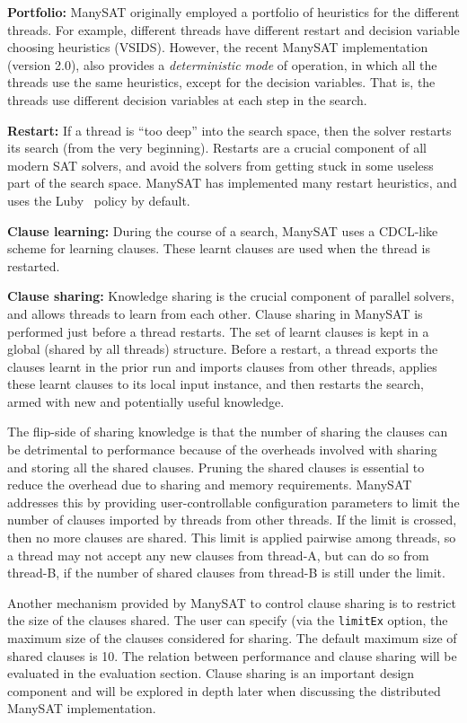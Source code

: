 \documentclass{article}
\begin{document}
\textbf{Portfolio: } ManySAT originally employed a portfolio of
heuristics for the different threads. For example, different threads
have different restart and decision variable choosing heuristics
(VSIDS). However, the recent ManySAT implementation (version 2.0),
also provides a \emph{deterministic mode} of operation, in which all
the threads use the same heuristics, except for the decision
variables. That is, the threads use different decision variables at
each step in the search.


\textbf{Restart: } If a thread is ``too deep'' into the search space,
then the solver restarts its search (from the very
beginning). Restarts are a crucial component of all modern SAT
solvers, and avoid the solvers from getting stuck in some useless part
of the search space. ManySAT has implemented many restart heuristics,
and uses the Luby~\cite{luby} policy by default.

\textbf{Clause learning: } During the course of a search, ManySAT uses
a CDCL-like scheme for learning clauses. These learnt clauses are used
when the thread is restarted.

\textbf{Clause sharing: } Knowledge sharing is the crucial component
of parallel solvers, and allows threads to learn from each
other. Clause sharing in ManySAT is performed just before a thread
restarts. The set of learnt clauses is kept in a global (shared by all
threads) structure. Before a restart, a thread exports the clauses
learnt in the prior run and imports clauses from other threads,
applies these learnt clauses to its local input instance, and then
restarts the search, armed with new and potentially useful
knowledge. 

The flip-side of sharing knowledge is that the number of sharing the
clauses can be detrimental to performance because of the overheads
involved with sharing and storing all the shared clauses. Pruning the
shared clauses is essential to reduce the overhead due to sharing and
memory requirements. ManySAT addresses this by providing
user-controllable configuration parameters to limit the number of
clauses imported by threads from other threads. If the limit is
crossed, then no more clauses are shared. This limit is applied
pairwise among threads, so a thread may not accept any new clauses
from thread-A, but can do so from thread-B, if the number of shared
clauses from thread-B is still under the limit.


Another mechanism provided by ManySAT to control clause sharing is to
restrict the size of the clauses shared. The user can specify (via the
\texttt{limitEx} option, the maximum size of the clauses considered
for sharing. The default maximum size of shared clauses is 10. The
relation between performance and clause sharing will be evaluated in
the evaluation section. Clause sharing is an important design
component and will be explored in depth later when discussing the
distributed ManySAT implementation.
\end{document}
